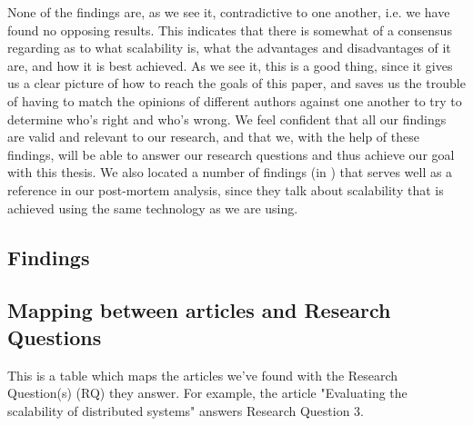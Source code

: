 \documentclass{article}
\begin{document}
None of the findings are, as we see it, contradictive to one another, i.e. we
have found no opposing results.  This indicates that there is somewhat of a
consensus regarding as to what scalability is, what the advantages and
disadvantages of it are, and how it is best achieved. As we see it, this is a
good thing, since it gives us a clear picture of how to reach the goals of this
paper, and saves us the trouble of having to match the opinions of different
authors against one another to try to determine who's right and who's wrong.
We feel confident that all our findings are valid and relevant to our research,
and that we, with the help of these findings, will be able to answer our
research questions and thus achieve our goal with this thesis.
We also located a number of findings
(in \cite{gropp1996high}\cite{miller2002pympi}\cite{millerparallel}) that
serves well as a reference in our post-mortem analysis, since they talk about
scalability that is achieved using the same technology as we are using.

\subsection{Findings}

\subsection{Mapping between articles and Research Questions}
This is a table which maps the articles we've found with the Research
Question(s) (RQ) they answer.  For example, the article "Evaluating the
scalability of distributed systems" answers Research Question 3.  
\end{document}
